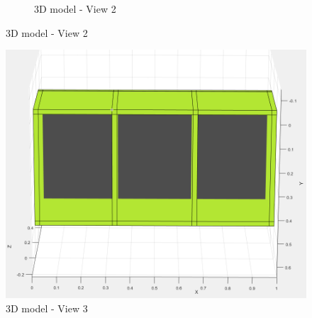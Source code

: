 \begin{figure}[H]
\begin{subfigure}[b]{0.4\textwidth}
         \caption{3D model - View 2}
     \end{subfigure}
\end{figure}

\begin{figure}[H]
    \centering
    \includegraphics[width=0.5\linewidth]{img/3d_2.jpg}
    \caption{3D model - View 3}
\end{figure}